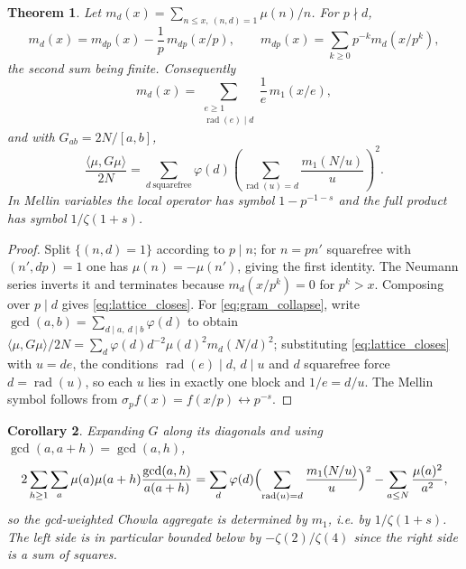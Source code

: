 \documentclass[11pt]{amsart}
\numberwithin{equation}{section}
\theoremstyle{plain}
\newtheorem{theorem}{Theorem}[section]
\newtheorem{corollary}[theorem]{Corollary}
\theoremstyle{definition}
\theoremstyle{remark}
\DeclareMathOperator{\rad}{rad}
\begin{document}
\begin{theorem}
\label{thm:multiplicative_collapse}
Let $m_d(x)=\sum_{n\le x,\ (n,d)=1}\mu(n)/n$. For $p\nmid d$,
\begin{equation}
m_d(x)=m_{dp}(x)-\frac1p\,m_{dp}(x/p),
\qquad
m_{dp}(x)=\sum_{k\ge0}p^{-k}m_d(x/p^k),
\label{eq:local_action}
\end{equation}
the second sum being finite. Consequently
\begin{equation}
m_d(x)=\sum_{\substack{e\ge1\\ \rad(e)\mid d}}\frac1e\,m_1(x/e),
\label{eq:lattice_closes}
\end{equation}
and with $G_{ab}=2N/[a,b]$,
\begin{equation}
\frac{\langle\mu,G\mu\rangle}{2N}
=\sum_{d\ \mathrm{squarefree}}\varphi(d)
\left(\sum_{\rad(u)=d}\frac{m_1(N/u)}{u}\right)^{2}.
\label{eq:gram_collapse}
\end{equation}
In Mellin variables the local operator has symbol $1-p^{-1-s}$ and the
full product has symbol $1/\zeta(1+s)$.
\end{theorem}

\begin{proof}
Split $\{(n,d)=1\}$ according to $p\mid n$; for $n=pn'$ squarefree with
$(n',dp)=1$ one has $\mu(n)=-\mu(n')$, giving the first identity. The
Neumann series inverts it and terminates because $m_d(x/p^k)=0$ for
$p^k>x$. Composing over $p\mid d$ gives \eqref{eq:lattice_closes}.
For \eqref{eq:gram_collapse}, write $\gcd(a,b)=\sum_{d\mid a,\ d\mid b}\varphi(d)$
to obtain
$\langle\mu,G\mu\rangle/2N=\sum_d\varphi(d)d^{-2}\mu(d)^2m_d(N/d)^2$;
substituting \eqref{eq:lattice_closes} with $u=de$, the conditions
$\rad(e)\mid d$, $d\mid u$ and $d$ squarefree force $d=\rad(u)$, so each
$u$ lies in exactly one block and $1/e=d/u$. The Mellin symbol follows
from $\sigma_pf(x)=f(x/p)\leftrightarrow p^{-s}$.
\end{proof}

\begin{corollary}
\label{cor:gcd_weight_is_inert}
Expanding $G$ along its diagonals and using
$\gcd(a,a+h)=\gcd(a,h)$,
\begin{equation}
2\sum_{h\ge1}\sum_a\mu(a)\mu(a+h)\frac{\gcd(a,h)}{a(a+h)}
=\sum_{d}\varphi(d)\Bigl(\sum_{\rad(u)=d}\frac{m_1(N/u)}{u}\Bigr)^2
-\sum_{a\le N}\frac{\mu(a)^2}{a^2},
\label{eq:gcd_aggregate}
\end{equation}
so the gcd-weighted Chowla aggregate is determined by $m_1$, i.e. by
$1/\zeta(1+s)$. The left side is in particular bounded below by
$-\zeta(2)/\zeta(4)$ since the right side is a sum of squares.
\end{corollary}
\end{document}

